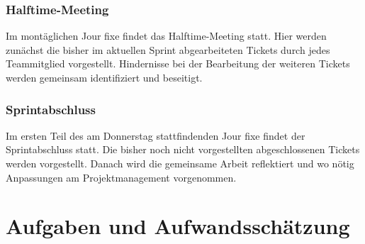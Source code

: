 \documentclass[a4paper,11pt,listof=numbered,glossary=totoc,parskip=half,toc=bib]{scrreprt}
\begin{document}
{\subsubsection{Halftime-Meeting}
Im montäglichen Jour fixe findet das Halftime-Meeting statt. Hier werden zunächst die bisher im aktuellen Sprint abgearbeiteten Tickets durch jedes Teammitglied vorgestellt. Hindernisse bei der Bearbeitung der weiteren Tickets werden gemeinsam identifiziert und beseitigt.

\subsubsection{Sprintabschluss}
Im ersten Teil des am Donnerstag stattfindenden Jour fixe findet der Sprintabschluss statt. Die bisher noch nicht vorgestellten abgeschlossenen Tickets werden vorgestellt. Danach wird die gemeinsame Arbeit reflektiert und wo nötig Anpassungen am Projektmanagement vorgenommen.


	
	\newpage
	\section{Aufgaben und Aufwandsschätzung}
	\label{sec:aufwand}
	
}
\end{document}
